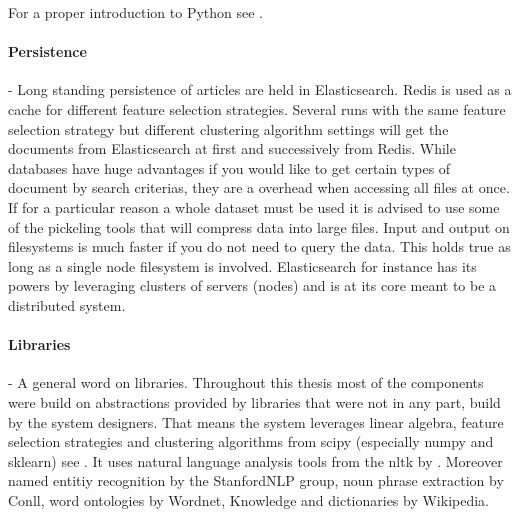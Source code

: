   For a proper introduction to Python see \cite{NltkPython}.

  \paragraph{Persistence} - Long standing persistence of articles are held in Elasticsearch. Redis is used as a cache for different feature selection strategies. Several runs with the same feature selection strategy but different clustering algorithm settings will get the documents from Elasticsearch at first and successively from Redis. While databases have huge advantages if you would like to get certain types of document by search criterias, they are a overhead when accessing all files at once. If for a particular reason a whole dataset must be used it is advised to use some of the pickeling tools that will compress data into large files. Input and output on filesystems is much faster if you do not need to query the data. This holds true as long as a single node filesystem is involved. Elasticsearch for instance has its powers by leveraging clusters of servers (nodes) and is at its core meant to be a distributed system.

  \paragraph{Libraries} - A general word on libraries. Throughout this thesis most of the components were build on abstractions provided by libraries that were not in any part, build by the system designers. That means the system leverages linear algebra, feature selection strategies and clustering algorithms from scipy (especially numpy and sklearn) see \cite{ScikitLearn}. It uses natural language analysis tools from the nltk by \cite{NltkPython}. Moreover named entitiy recognition by the StanfordNLP group, noun phrase extraction by Conll, word ontologies by Wordnet, Knowledge and dictionaries by Wikipedia.



